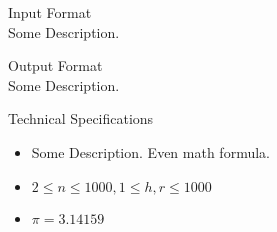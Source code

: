 \documentclass[12pt, a4paper, solution]{quiz}
\begin{document}
\lipsum[2-3]

\begin{myitemize}
\item Input Format\\
Some Description.
\item Output Format\\
Some Description.
\item Technical Specifications
\begin{itemize}
\item Some Description. Even math formula. 
\item $2 \leq n \leq 1000, 1 \leq h, r \leq 1000$
\item $\pi = 3.14159$
\end{itemize}
\end{myitemize}
\begin{testcase}
\end{testcase}

\end{document}
